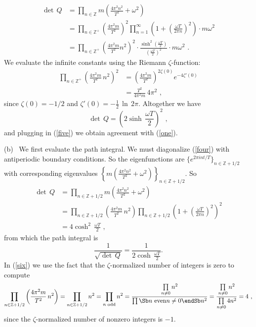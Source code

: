 \documentclass[12pt,leqno]{article}
\newcommand{\dbZ}{{\mathbb{Z}}}
\theoremstyle{plain}
{\theorembodyfont{}\newtheorem{thm}{Theorem}}
\theoremstyle{remark}
{\theorembodyfont{\rmfamily} \newtheorem*{Rem}{\bf Remark}}
\begin{document}
\begin{align*}
\det\,Q
&=\prod\limits_{n\in\dbZ}m
\left(\frac{4\pi^2n^2}{T^2}+\omega^2\right)\\
&=\prod\limits_{n\in\dbZ^+}\left(\frac{4\pi^2m}{T^2}\right)^2
\prod\limits_{n=1}^\infty\left(1+\left(\frac{\omega T}
{2\pi n}\right)^2\right)\cdot m\omega^2\\
&=\prod\limits_{n\in\dbZ^+}\left(\frac{4\pi^2m}{T^2}
  n^2\right)^2\cdot\frac{\sinh^2\left(\frac{\omega T}{2}\right)}
{\left(\frac{\omega T}{2}\right)^2}\cdot m\omega^2\,\,.
\end{align*}
We evaluate the infinite constants using the Riemann
$\zeta$-function:
\begin{align*}
\prod\limits_{n\in\dbZ^+}\left(\frac{4\pi^2m}{T^2}\,n^2\right)^2
&=\left(\frac{4\pi^2m}{T^2}\right)^{2\zeta(0)}e^{-4\zeta'(0)}\\
&=\frac{T^2}{4\pi^2m}\,4\pi^2\,\,,
\end{align*}
since $\zeta(0)=-1/2$ and $\zeta'(0)=-\frac12\,\ln\,2\pi$.
Altogether we have
$$
\det\,Q=\left(2\sinh\,\frac{\omega T}{2}\right)^2\,\,,
$$
and plugging in (\ref{five}) we obtain agreement with
(\ref{one}).

\bigskip\noindent
(b) \ 
We first evaluate the path integral.
We must diagonalize (\ref{four}) with antiperiodic boundary
conditions.
So the eigenfunctions are $\{e^{2\pi int/T}\}_{n\in\dbZ+1/2}$
with corresponding eigenvalues
$\left\{m\left(\frac{4\pi^2n^2}{T^2}
+\omega^2\right)\right\}_{n\in\dbZ+1/2}$.
So
\begin{equation}
\begin{aligned}
\det\,Q
&=\prod\limits_{n\in\dbZ+1/2}m\left(\frac{4\pi^2n^2}{T^2}
  +\omega^2\right)\\
&=\prod\limits_{n\in\dbZ+1/2}\left(\frac{4\pi^2m}{T^2}
  \,n^2\right)\prod\limits_{n\in\dbZ+1/2}\left(1+
  \left(\frac{\omega T}{2\pi n}\right)^2\right)^2\\
&=4\cosh^2\,\frac{\omega T}{2}\,\,,
\label{six}
\end{aligned}
\end{equation}
from which the path integral is
\begin{equation}
\frac{1}{\sqrt{\det\,Q}}=\frac{1}{2\cosh\,\frac{\omega T}{2}}.
\label{seven}
\end{equation}
In (\ref{six}) we use the fact that the $\zeta$-normalized
number of integers is zero to compute
$$
\prod\limits_{n\in\dbZ+1/2}\left(\frac{4\pi^2m}{T^2}\,n^2\right)
=\prod\limits_{n\in\dbZ+1/2}n^2=\prod\limits_{\text{$n$
odd}}n^2=\frac{\prod\limits_{n\not=0}n^2}
{\prod\limits
\Sb
\text{$n$ even}\\
n\not=0
\endSb
n^2}=\frac{\prod\limits_{n\not=0}n^2}
{\prod\limits_{n\not=0}4n^2}=4\,\,,
$$
since the $\zeta$-normalized number of nonzero integers is
$-1$.
\end{document}
